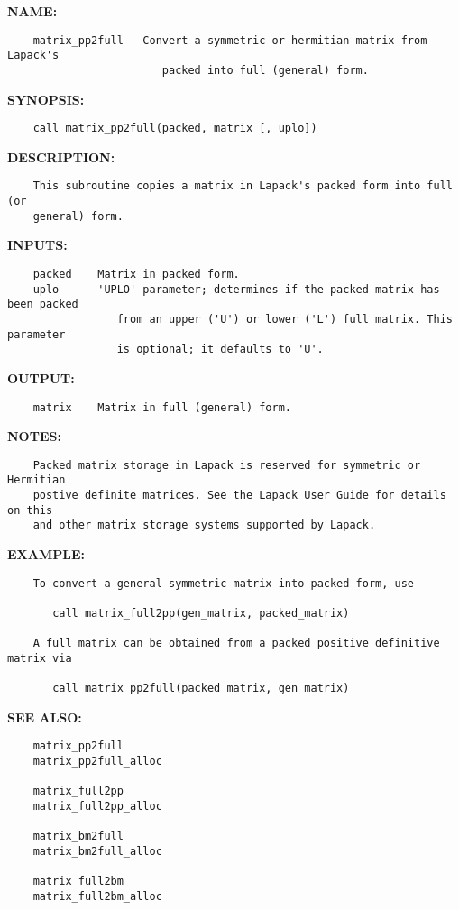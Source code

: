 \label{ch:robo22}
\label{ch:Matrices_matrix_pp2full}
\textbf{NAME:}\hspace{0.08in}\begin{Verbatim}
    matrix_pp2full - Convert a symmetric or hermitian matrix from Lapack's
                        packed into full (general) form.
\end{Verbatim}
\textbf{SYNOPSIS:}\hspace{0.08in}\begin{Verbatim}
    call matrix_pp2full(packed, matrix [, uplo])
\end{Verbatim}
\textbf{DESCRIPTION:}\hspace{0.08in}\begin{Verbatim}
    This subroutine copies a matrix in Lapack's packed form into full (or 
    general) form.
\end{Verbatim}
\textbf{INPUTS:}\hspace{0.08in}\begin{Verbatim}
    packed    Matrix in packed form.
    uplo      'UPLO' parameter; determines if the packed matrix has been packed
                 from an upper ('U') or lower ('L') full matrix. This parameter
                 is optional; it defaults to 'U'.
\end{Verbatim}
\textbf{OUTPUT:}\hspace{0.08in}\begin{Verbatim}
    matrix    Matrix in full (general) form.
\end{Verbatim}
\textbf{NOTES:}\hspace{0.08in}\begin{Verbatim}
    Packed matrix storage in Lapack is reserved for symmetric or Hermitian
    postive definite matrices. See the Lapack User Guide for details on this
    and other matrix storage systems supported by Lapack. 
\end{Verbatim}
\textbf{EXAMPLE:}\hspace{0.08in}\begin{Verbatim}
    To convert a general symmetric matrix into packed form, use

       call matrix_full2pp(gen_matrix, packed_matrix)

    A full matrix can be obtained from a packed positive definitive matrix via

       call matrix_pp2full(packed_matrix, gen_matrix)
\end{Verbatim}
\textbf{SEE ALSO:}\hspace{0.08in}\begin{Verbatim}
    matrix_pp2full
    matrix_pp2full_alloc

    matrix_full2pp
    matrix_full2pp_alloc

    matrix_bm2full
    matrix_bm2full_alloc

    matrix_full2bm
    matrix_full2bm_alloc
\end{Verbatim}
